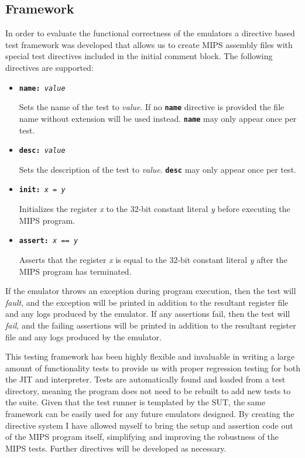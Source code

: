 \subsection{Framework}

In order to evaluate the functional correctness of the emulators a directive based test framework was developed that allows us to create MIPS assembly files with special test directives included in the initial comment block. The following directives are supported:

\begin{itemize}
    \item \texttt{\textbf{name:} \textit{value}}
    
    Sets the name of the test to \textit{value}. If no \texttt{\textbf{name}} directive is provided the file name without extension will be used instead. \texttt{\textbf{name}} may only appear once per test.

    \item \texttt{\textbf{desc:} \textit{value}}
    
    Sets the description of the test to \textit{value}. \texttt{\textbf{desc}} may only appear once per test.

    \item \texttt{\textbf{init:} \textit{x} = \textit{y}}
    
    Initializes the register \textit{x} to the 32-bit constant literal \textit{y} before executing the MIPS program.

    \item \texttt{\textbf{assert:} \textit{x} == \textit{y}}
    
    Asserts that the register \textit{x} is equal to the 32-bit constant literal \textit{y} after the MIPS program has terminated.
\end{itemize}

If the emulator throws an exception during program execution, then the test will \emph{fault}, and the exception will be printed in addition to the resultant register file and any logs produced by the emulator. If any assertions fail, then the test will \emph{fail}, and the failing assertions will be printed in addition to the resultant register file and any logs produced by the emulator.

This testing framework has been highly flexible and invaluable in writing a large amount of functionality tests to provide us with proper regression testing for both the JIT and interpreter. Tests are automatically found and loaded from a test directory, meaning the program does not need to be rebuilt to add new tests to the suite. Given that the test runner is templated by the SUT, the same framework can be easily used for any future emulators designed. By creating the directive system I have allowed myself to bring the setup and assertion code out of the MIPS program itself, simplifying and improving the robustness of the MIPS tests. Further directives will be developed as necessary.

